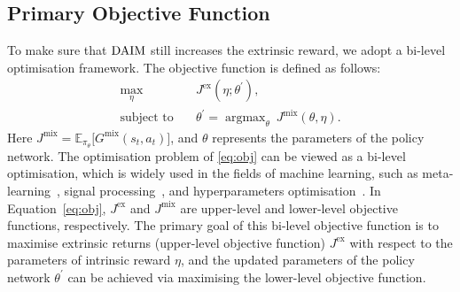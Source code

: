 \subsection{Primary Objective Function}
To make sure that $\text{DAIM}$ still increases the extrinsic reward, we adopt a bi-level optimisation framework. The objective function is defined as follows:
\begin{align}
  \label{eq:obj}
  \max_{\eta}\quad & J^{\text{ex}}(\eta;\theta^{\prime}),\\ 
  \text{subject to}\quad & \theta^{\prime} =\mathop{\arg\max}_{\theta}\ J^{\text{mix}}(\theta, \eta).
  \nonumber
\end{align}
Here $J^{\text{mix}} = \mathbb{E}_{\pi_{\theta}}\bigr[G^{\text{mix}}(s_t,a_t) \bigr]$, and $\theta$ represents the parameters of the policy network.
The optimisation problem of \eqref{eq:obj} can be viewed as a bi-level optimisation, which is widely used in the fields of machine learning, such as meta-learning~\cite{andrychowicz2016learning,nichol2018first,santoro2016meta,xu2018meta,zheng2018learning}, signal processing~\cite{kunapuli2008classification,flamary2014learning}, and hyperparameters optimisation~\cite{franceschi2018bilevel, shaban2019truncated}. In Equation~\eqref{eq:obj}, $J^{\text{ex}}$ and $J^{\text{mix}}$ are upper-level and lower-level objective functions, respectively. The primary goal of this bi-level objective function is to maximise extrinsic returns (upper-level objective function) $J^{\text{ex}}$ with respect to the parameters of intrinsic reward $\eta$, and the updated parameters of the policy network $\theta^{\prime}$ can be achieved via maximising the lower-level objective function.


